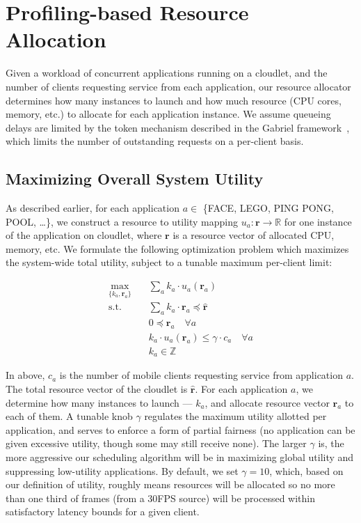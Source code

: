 \section{Profiling-based Resource Allocation}

Given a workload of concurrent applications running on a cloudlet, and
the number of clients requesting service from each application, our
resource allocator determines how many instances to launch and how
much resource (CPU cores, memory, etc.) to allocate for each
application instance.  We assume queueing delays are limited by the
token mechanism described in the Gabriel framework~\cite{Ha2014},
which limits the number of outstanding requests on a per-client basis.


\subsection{Maximizing Overall System Utility}

As described earlier, for each application $a \in $ \{FACE, LEGO, PING PONG, POOL, \ldots \}, 
we construct a resource to utility mapping
$u_a: \mathbf{r} \rightarrow \mathbb{R}$ for one instance of the application on cloudlet, 
where $\mathbf{r}$ is a resource vector of allocated CPU, memory, etc. We formulate the 
following optimization problem which maximizes the system-wide total utility,
subject to a tunable maximum per-client limit:

\begin{equation}
  \begin{aligned}
  \max_{\{k_a, \mathbf{r}_a\}} \quad & \sum_a{k_a \cdot u_a(\mathbf{r}_a)} \\
  \textrm{s.t.} \quad & \sum_a k_a \cdot \mathbf{r}_a \preccurlyeq \hat{\mathbf{r}} \\
      & 0 \preccurlyeq \mathbf{r}_a  \quad \forall a \\
      & k_a \cdot u_a(\mathbf{r}_a) \le \gamma \cdot c_a \quad \forall a \\
      & k_a \in \mathbb{Z}
  \end{aligned}
  \end{equation}

In above, $c_a$ is the number of mobile clients requesting service from application $a$.
The total resource vector of the cloudlet is  $\hat{\mathbf{r}}$. 
 For each application $a$, we determine how many instances to launch --- $k_a$, and 
allocate resource vector $\mathbf{r}_a$ to each of them.
A tunable knob $\gamma$ regulates the maximum utility allotted 
per application, and serves to enforce a form of partial fairness (no application
can be given excessive utility, though some may still receive none). 
The larger $\gamma$ is, the more aggressive our scheduling algorithm
will be in maximizing global utility and
suppressing low-utility applications. 
By default, we set $\gamma=10$, which, based on our definition of
utility, roughly means resources will be allocated so 
no more than one third of frames (from a 30FPS source) 
will be processed within satisfactory latency bounds for a given
client.

